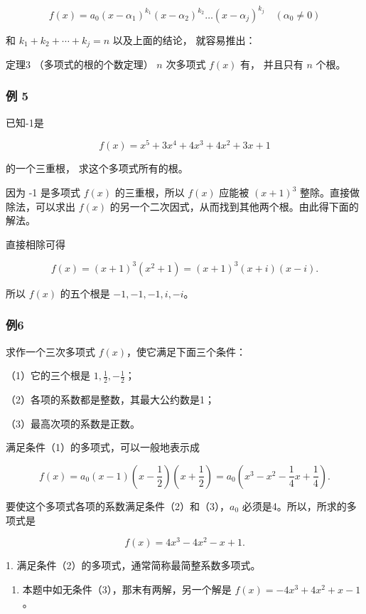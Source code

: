 \[
f (x) = a _ {0} \left(x - \alpha_ {1}\right) ^ {k _ {1}} \left(x - \alpha_ {2}\right) ^ {k _ {2}} \dots \left(x - \alpha_ {j}\right) ^ {k _ {j}} \quad (\alpha_ {0} \neq 0)
\]

和 \(k_{1}+k_{2}+\cdots+k_{j}=n\) 以及上面的结论， 就容易推出：

定理3 （多项式的根的个数定理） \(n\) 次多项式 \(f(x)\) 有， 并且只有
\(n\) 个根。

\subsubsection{例 5}

已知-1是

\[
f (x) = x ^ {5} + 3 x ^ {4} + 4 x ^ {3} + 4 x ^ {2} + 3 x + 1
\]

的一个三重根， 求这个多项式所有的根。


因为 -1 是多项式 \(f(x)\) 的三重根，所以 \(f(x)\) 应能被 \((x+1)^{3}\)
整除。直接做除法，可以求出 \(f(x)\)
的另一个二次因式，从而找到其他两个根。由此得下面的解法。


直接相除可得

\[
f(x)=(x+1)^3(x^2+1)=(x+1)^3(x+i)(x-i).
\]

所以 \(f(x)\) 的五个根是 \(-1,-1,-1,i,-i\)。

\subsubsection{例6}

求作一个三次多项式 \(f(x)\)，使它满足下面三个条件：

（1）它的三个根是 \(1,\frac12,-\frac12\)；

（2）各项的系数都是整数，其最大公约数是1；

（3）最高次项的系数是正数。

 满足条件（1）的多项式，可以一般地表示成

\[
f(x)=a_0(x-1)\left(x-\frac12\right)\left(x+\frac12\right)
=a_0\left(x^3-x^2-\frac14x+\frac14\right).
\]

要使这个多项式各项的系数满足条件（2）和（3），\(a_0\)
必须是4。所以，所求的多项式是

\[
f(x)=4x^3-4x^2-x+1.
\]

 1. 满足条件（2）的多项式，通常简称最简整系数多项式。

\begin{enumerate}[start=2]
\item
  本题中如无条件（3），那末有两解，另一个解是 \(f(x)=-4x^3+4x^2+x-1\)。
\end{enumerate}

